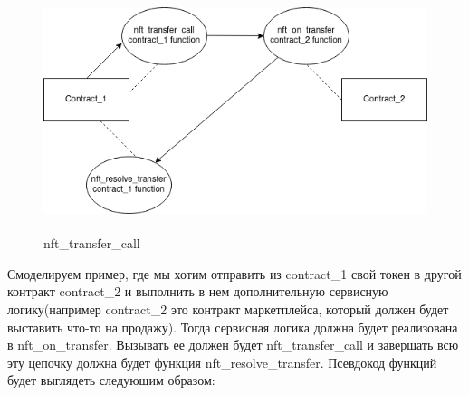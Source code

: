 \begin{figure}[H]
	\centering
	\includegraphics[height=70mm]{fig/temp.png}
	\caption{nft\_transfer\_call}
\end{figure}

Смоделируем пример, где мы хотим отправить из contract\_1 свой токен в другой контракт contract\_2 и выполнить в нем дополнительную сервисную логику(например contract\_2 это контракт маркетплейса, который должен будет выставить что-то на продажу).
Тогда сервисная логика должна будет реализована в nft\_on\_transfer. Вызывать ее должен будет nft\_transfer\_call и завершать всю эту цепочку должна будет функция nft\_resolve\_transfer.
Псевдокод функций будет выглядеть следующим образом:

